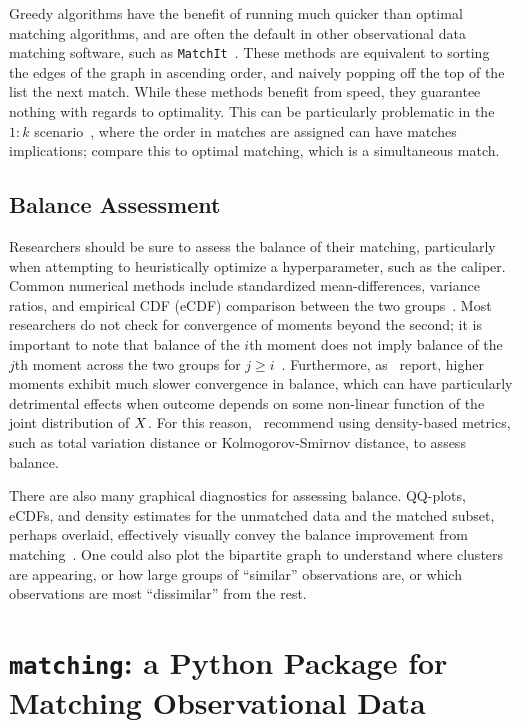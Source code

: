 \documentclass[11pt]{extarticle}
\begin{document}
Greedy algorithms have the benefit of running much quicker than optimal matching algorithms, and are often the default in other observational data matching software, such as \texttt{MatchIt}~\parencite{ho_matchit_2011}. These methods are equivalent to sorting the edges of the graph in ascending order, and naively popping off the top of the list the next match. While these methods benefit from speed, they guarantee nothing with regards to optimality. This can be particularly problematic in the $1:k$ scenario~\parencite{rosenbaum_optimal_1989}, where the order in matches are assigned can have matches implications; compare this to optimal matching, which is a simultaneous match.

\subsection{Balance Assessment}

Researchers should be sure to assess the balance of their matching, particularly when attempting to heuristically optimize a hyperparameter, such as the caliper.
Common numerical methods include standardized mean-differences, variance ratios, and empirical CDF (eCDF) comparison between the two groups~\parencite{greifer_assessing_2022}.
Most researchers do not check for convergence of moments beyond the second; it is important to note that balance of the $i$th moment does not imply balance of the $j$th moment across the two groups for $j \geq i$~\parencite{garrido_methods_2014}.
Furthermore, as~\textcite{basu_use_2008} report, higher moments exhibit much slower convergence in balance, which can have particularly detrimental effects when outcome depends on some non-linear function of the joint distribution of $X$.
For this reason,~\textcite{zhu_kernel-based_2018} recommend using density-based metrics, such as total variation distance or Kolmogorov-Smirnov distance, to assess balance.

There are also many graphical diagnostics for assessing balance. QQ-plots, eCDFs, and density estimates for the unmatched data and the matched subset, perhaps overlaid, effectively visually convey the balance improvement from matching~\parencite{greifer_assessing_2022}. One could also plot the bipartite graph to understand where clusters are appearing, or how large groups of ``similar'' observations are, or which observations are most ``dissimilar'' from the rest.


\section{\texttt{matching}: a Python Package for Matching Observational Data}
\end{document}
